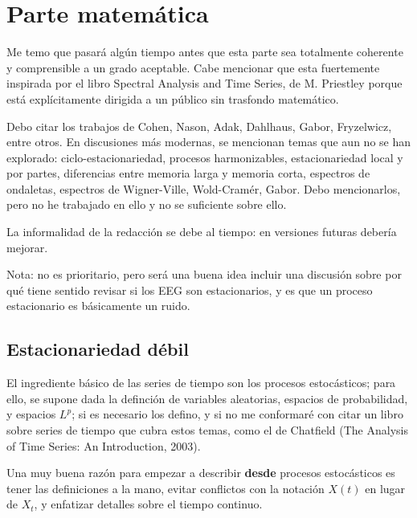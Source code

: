\chapter{Parte matem\'atica}

Me temo que pasar\'a alg\'un tiempo antes que esta parte sea totalmente coherente
y comprensible a un grado aceptable. Cabe mencionar
que esta fuertemente inspirada por el libro Spectral Analysis and Time Series, 
de M. Priestley \cite{Priestley81} porque est\'a expl\'icitamente dirigida a un p\'ublico 
sin trasfondo matem\'atico.

Debo citar los trabajos de Cohen, Nason, Adak, Dahlhaus, Gabor, Fryzelwicz, entre otros.
En discusiones m\'as modernas, se mencionan temas que aun no se han explorado:
ciclo-estacionariedad, procesos harmonizables, estacionariedad local y por partes,
diferencias entre memoria larga y memoria corta, espectros de ondaletas, espectros de
Wigner-Ville, Wold-Cram\'er, Gabor. 
Debo mencionarlos, pero no he trabajado en ello y no se suficiente sobre ello.

La informalidad de la redacci\'on se debe al tiempo: en versiones futuras deber\'ia mejorar.

Nota: no es prioritario, pero ser\'a una buena idea incluir una discusi\'on sobre por qu\'e
tiene sentido revisar si los EEG son estacionarios, y es que un proceso estacionario es 
b\'asicamente un ruido.


\section{Estacionariedad d\'ebil}

El ingrediente b\'asico de las series de tiempo son los procesos estoc\'asticos; para ello, se
supone dada la definci\'on de variables aleatorias, espacios de probabilidad, y espacios $L^{p}$;
si es necesario los defino, y si no me conformar\'e con citar un libro sobre series de tiempo
que cubra estos temas,
como el de Chatfield (The Analysis of Time Series: An Introduction, 2003).

Una muy buena raz\'on para empezar a describir \textbf{desde} procesos estoc\'asticos es tener
las definiciones a la mano, evitar conflictos con la notaci\'on $X(t)$ en lugar de $X_t$, y
enfatizar detalles sobre el tiempo continuo.


